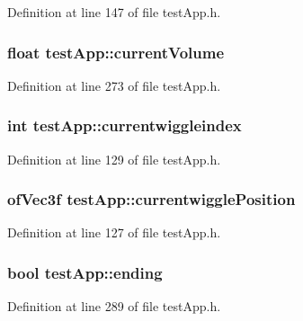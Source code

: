 Definition at line 147 of file test\-App.\-h.

\hypertarget{classtest_app_a51c20c5432d9f6b06f719526d9a34ee6}{
\subsubsection[{current\-Volume}]{\setlength{\rightskip}{0pt plus 5cm}float test\-App\-::current\-Volume}}\label{classtest_app_a51c20c5432d9f6b06f719526d9a34ee6}


Definition at line 273 of file test\-App.\-h.

\hypertarget{classtest_app_a6b9af0b1ae4a2c0530eb6a8cf8340751}{
\subsubsection[{currentwiggleindex}]{\setlength{\rightskip}{0pt plus 5cm}int test\-App\-::currentwiggleindex}}\label{classtest_app_a6b9af0b1ae4a2c0530eb6a8cf8340751}


Definition at line 129 of file test\-App.\-h.

\hypertarget{classtest_app_af81358868ae15faab1974ec074b1509f}{
\subsubsection[{currentwiggle\-Position}]{\setlength{\rightskip}{0pt plus 5cm}of\-Vec3f test\-App\-::currentwiggle\-Position}}\label{classtest_app_af81358868ae15faab1974ec074b1509f}


Definition at line 127 of file test\-App.\-h.

\hypertarget{classtest_app_acf09303bc452d2a38098f6bf94655408}{
\subsubsection[{ending}]{\setlength{\rightskip}{0pt plus 5cm}bool test\-App\-::ending}}\label{classtest_app_acf09303bc452d2a38098f6bf94655408}


Definition at line 289 of file test\-App.\-h.

